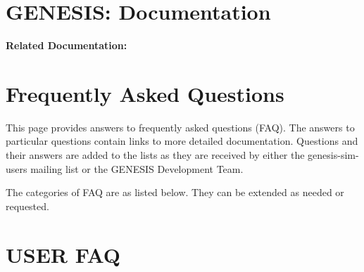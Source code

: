 \documentclass[12pt]{article}
\begin{document}
\section*{GENESIS: Documentation}

{\bf Related Documentation:}

\section*{Frequently Asked Questions}

This page provides answers to frequently asked questions (FAQ). The answers to particular questions contain links to more detailed documentation. Questions and their answers are added to the lists as they are received by either the genesis-sim-users mailing list or the GENESIS Development Team.

The categories of FAQ are as listed below. They can be extended as needed or requested.

\section*{USER FAQ}
\end{document}
